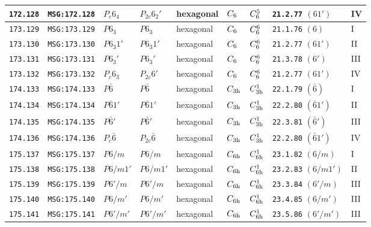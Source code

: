 \documentclass[fleqn,10pt]{jsarticle}
\begin{document}
\begin{center}
\begin{longtable}{lllllllll}
\texttt{172.128} & \texttt{MSG:172.128} & $P_{c}6_{4}$ & $P_{2c}6_{2}'$ & hexagonal & $C_{\rm 6}$ & $C_{\rm 6}^{5}$ & \texttt{21.2.77} $(61')$ & IV \\ \hline
\texttt{173.129} & \texttt{MSG:173.129} & $P6_{3}$ & $P6_{3}$ & hexagonal & $C_{\rm 6}$ & $C_{\rm 6}^{6}$ & \texttt{21.1.76} $(6)$ & I \\
\texttt{173.130} & \texttt{MSG:173.130} & $P6_{3}1'$ & $P6_{3}1'$ & hexagonal & $C_{\rm 6}$ & $C_{\rm 6}^{6}$ & \texttt{21.2.77} $(61')$ & II \\
\texttt{173.131} & \texttt{MSG:173.131} & $P6_{3}'$ & $P6_{3}'$ & hexagonal & $C_{\rm 6}$ & $C_{\rm 6}^{6}$ & \texttt{21.3.78} $(6')$ & III \\
\texttt{173.132} & \texttt{MSG:173.132} & $P_{c}6_{3}$ & $P_{2c}6'$ & hexagonal & $C_{\rm 6}$ & $C_{\rm 6}^{6}$ & \texttt{21.2.77} $(61')$ & IV \\ \hline
\texttt{174.133} & \texttt{MSG:174.133} & $P\bar{6}$ & $P\bar{6}$ & hexagonal & $C_{\rm 3h}$ & $C_{\rm 3h}^{1}$ & \texttt{22.1.79} $(\bar{6})$ & I \\
\texttt{174.134} & \texttt{MSG:174.134} & $P\bar{6}1'$ & $P\bar{6}1'$ & hexagonal & $C_{\rm 3h}$ & $C_{\rm 3h}^{1}$ & \texttt{22.2.80} $(\bar{6}1')$ & II \\
\texttt{174.135} & \texttt{MSG:174.135} & $P\bar{6}'$ & $P\bar{6}'$ & hexagonal & $C_{\rm 3h}$ & $C_{\rm 3h}^{1}$ & \texttt{22.3.81} $(\bar{6}')$ & III \\
\texttt{174.136} & \texttt{MSG:174.136} & $P_{c}\bar{6}$ & $P_{2c}\bar{6}$ & hexagonal & $C_{\rm 3h}$ & $C_{\rm 3h}^{1}$ & \texttt{22.2.80} $(\bar{6}1')$ & IV \\ \hline
\texttt{175.137} & \texttt{MSG:175.137} & $P6/m$ & $P6/m$ & hexagonal & $C_{\rm 6h}$ & $C_{\rm 6h}^{1}$ & \texttt{23.1.82} $(6/m)$ & I \\
\texttt{175.138} & \texttt{MSG:175.138} & $P6/m1'$ & $P6/m1'$ & hexagonal & $C_{\rm 6h}$ & $C_{\rm 6h}^{1}$ & \texttt{23.2.83} $(6/m1')$ & II \\
\texttt{175.139} & \texttt{MSG:175.139} & $P6'/m$ & $P6'/m$ & hexagonal & $C_{\rm 6h}$ & $C_{\rm 6h}^{1}$ & \texttt{23.3.84} $(6'/m)$ & III \\
\texttt{175.140} & \texttt{MSG:175.140} & $P6/m'$ & $P6/m'$ & hexagonal & $C_{\rm 6h}$ & $C_{\rm 6h}^{1}$ & \texttt{23.4.85} $(6/m')$ & III \\
\texttt{175.141} & \texttt{MSG:175.141} & $P6'/m'$ & $P6'/m'$ & hexagonal & $C_{\rm 6h}$ & $C_{\rm 6h}^{1}$ & \texttt{23.5.86} $(6'/m')$ & III \\

\end{longtable}
\end{center}
\end{document}
